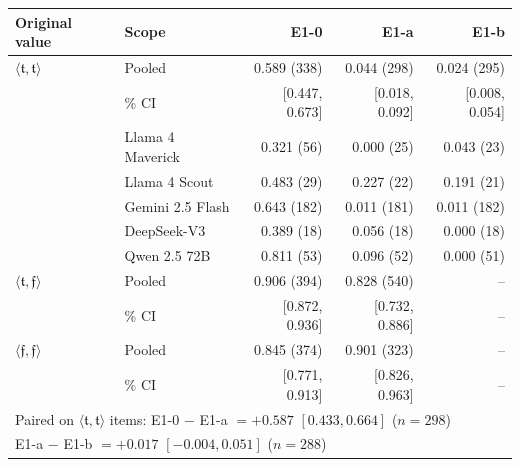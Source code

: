 \begin{tabular}{l@{\quad}l@{\qquad}r@{\quad}r@{\quad}r}
\toprule
Original value & Scope & E1-0 & E1-a & E1-b \\
\midrule
$\langle\mathfrak{t},\mathfrak{t}\rangle$ & Pooled & 0.589 (338) & 0.044 (298) & 0.024 (295) \\
 & \quad 95\% CI & [0.447, 0.673] & [0.018, 0.092] & [0.008, 0.054] \\
 & Llama 4 Maverick & 0.321 (56) & 0.000 (25) & 0.043 (23) \\
 & Llama 4 Scout & 0.483 (29) & 0.227 (22) & 0.191 (21) \\
 & Gemini 2.5 Flash & 0.643 (182) & 0.011 (181) & 0.011 (182) \\
 & DeepSeek-V3 & 0.389 (18) & 0.056 (18) & 0.000 (18) \\
 & Qwen 2.5 72B & 0.811 (53) & 0.096 (52) & 0.000 (51) \\
\midrule
$\langle\mathfrak{t},\mathfrak{f}\rangle$ & Pooled & 0.906 (394) & 0.828 (540) & -- \\
 & \quad 95\% CI & [0.872, 0.936] & [0.732, 0.886] & -- \\
\midrule
$\langle\mathfrak{f},\mathfrak{f}\rangle$ & Pooled & 0.845 (374) & 0.901 (323) & -- \\
 & \quad 95\% CI & [0.771, 0.913] & [0.826, 0.963] & -- \\
\midrule
\multicolumn{5}{l}{Paired on $\langle\mathfrak{t},\mathfrak{t}\rangle$ items: E1-0 $-$ E1-a $= +0.587$ $[0.433, 0.664]$ ($n=298$)} \\
\multicolumn{5}{l}{\phantom{Paired on $\langle\mathfrak{t},\mathfrak{t}\rangle$ items: }E1-a $-$ E1-b $= +0.017$ $[-0.004, 0.051]$ ($n=288$)} \\
\bottomrule
\end{tabular}
